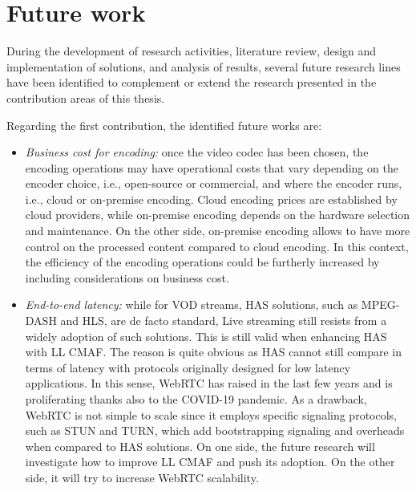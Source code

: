 \section{Future work}

During the development of research activities, literature review, design and implementation of solutions, and analysis of results, several future research lines have been identified to complement or extend the research presented in the contribution areas of this thesis.

Regarding the first contribution, the identified future works are:
\begin{itemize}
	\item \textit{Business cost for encoding:} once the video codec has been chosen, the encoding operations may have operational costs that vary depending on the encoder choice, i.e., open-source or commercial, and where the encoder runs, i.e., cloud or on-premise encoding. Cloud encoding prices are established by cloud providers, while on-premise encoding depends on the hardware selection and maintenance. On the other side, on-premise encoding allows to have more control on the processed content compared to cloud encoding. In this context, the efficiency of the encoding operations could be furtherly increased by including considerations on business cost.
	\item \textit{End-to-end latency:} while for VOD streams, HAS solutions, such as MPEG-DASH and HLS, are de facto standard, Live streaming still resists from a widely adoption of such solutions. This is still valid when enhancing HAS with LL CMAF. The reason is quite obvious as HAS cannot still compare in terms of latency with protocols originally designed for low latency applications. In this sense, WebRTC has raised in the last few years and is proliferating thanks also to the COVID-19 pandemic. As a drawback, WebRTC is not simple to scale since it employs specific signaling protocols, such as STUN and TURN, which add bootstrapping signaling and overheads when compared to HAS solutions. On one side, the future research will investigate how to improve LL CMAF and push its adoption. On the other side, it will try to increase WebRTC scalability.
\end{itemize}

